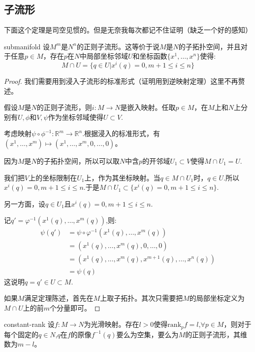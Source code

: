 \documentclass{package/fancy-book}
\newcommand{\R}{\mathbb{R}}
\begin{document}
\subsection{子流形}
下面这个定理是司空见惯的。但是无奈我每次都记不住证明（缺乏一个好的感知）
\begin{theorem}[正则子流形的标准形式]{submanifold}
    设$M^m$是$N^n$的正则子流形。这等价于说$M$是$N$的子拓扑空间，并且对于任意$p \in M$，存在$p$在$N$中局部坐标邻域$U$和坐标函数$\{x^1,\dots,x^n\}$使得:
    \begin{equation}
        M \cap U=\{q \in U|x^i(q)=0,m+1\leq i \leq n\}
    \end{equation}
\end{theorem}
\begin{proof}
    我们需要用到浸入子流形的标准形式（证明用到逆映射定理）这里不再赘述。

    假设$M$是$N$的正则子流形，则$i:M \to N$是嵌入映射。任取$p \in M$，在$M$上和$N$上分别有$U,\phi$和$V,\psi$作为坐标邻域使得$U \subset V$.

    考虑映射$\psi \circ \phi^{-1}:\R^m \to \R^n$.根据浸入的标准形式，有$(x^1,\dots,x^m) \mapsto (x^1,\dots,x^m,0,\dots,0)$。

    因为$M$是$N$的子拓扑空间，所以可以取$N$中含$p$的开邻域$U_1 \subset V$使得$M \cap U_1 = U$.

    我们把$V$上的坐标限制在$U_1$上，作为其坐标映射。当$q \in M \cap U_1$时，$q \in U$.所以$x^i(q)=0,m+1\leq i \leq n$.于是$M \cap U_1\subset \{x^i(q)=0,m+1\leq i \leq n\}$.

    另一方面，设$q \in U_1$且$x^i(q)=0,m+1\leq i \leq n$.

    记$q'=\varphi^{-1}(x^1(q),\dots,x^m(q))$,则:
    \begin{align}
        \psi(q')&=\psi \circ \varphi^{-1}(x^{1}(q),\dots,x^m(q))\\&=(x^1(q),\dots,x^m(q),0,\dots,0)\\&=(x^1(q),\dots,x^m(q),x^{m+1}(q),\dots,x^n(q))\\&=\psi(q)
    \end{align}
    这说明$q=q' \in U \subset M$.

    如果$M$满足定理陈述，首先在$M$上取子拓扑。其次只需要把$M$的局部坐标定义为$M \cap U$上的前$m$个分量即可。
\end{proof}
\begin{theorem}[常秩定理]{constant-rank}
    设$f:M \to N$为光滑映射。存在$l>0$使得$\mathrm{rank}_p f=l$,$\forall p \in M$，则对于每个固定的$q \in N$,$q$在$f$的原像$f^{-1}(q)$要么为空集，要么为$M$的正则子流形，其维数为$m-l$。
\end{theorem}
\end{document}
